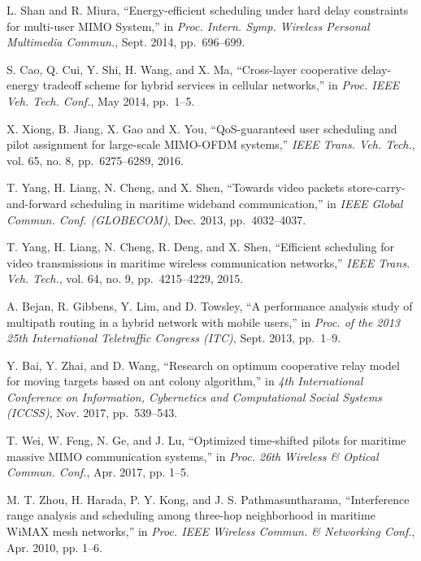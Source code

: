 \documentclass[conference]{IEEEtran}
\begin{document}
\begin{thebibliography}{10}
  L. Shan and R. Miura, ``Energy-efficient scheduling under hard delay constraints for multi-user MIMO System,'' in
  \emph{Proc. Intern. Symp. Wireless Personal Multimedia Commun.}, Sept. 2014, pp.~696--699.
  
  S. Cao, Q. Cui, Y. Shi, H. Wang, and X. Ma, ``Cross-layer cooperative delay-energy tradeoff scheme for hybrid services in cellular networks,'' in
  \emph{Proc. IEEE Veh. Tech. Conf.}, May 2014, pp.~1--5.
  
  X. Xiong, B. Jiang, X. Gao and X. You, ``QoS-guaranteed user scheduling and pilot assignment for large-scale MIMO-OFDM systems,''
  \emph{IEEE Trans. Veh. Tech.}, vol. 65, no. 8, pp.~6275--6289, 2016.
  
  

  T. Yang, H. Liang, N. Cheng, and X. Shen, 
  ``Towards video packets store-carry-and-forward scheduling in maritime wideband communication,'' in
  \emph{IEEE Global Commun. Conf. (GLOBECOM)}, Dec. 2013, pp.~4032--4037.

  T. Yang, H. Liang, N. Cheng, R. Deng, and X. Shen, ``Efficient scheduling for video transmissions in maritime wireless communication networks,'' 
  \emph{IEEE Trans. Veh. Tech.}, vol. 64, no. 9, pp.~4215--4229, 2015.

  A. Bejan, R. Gibbens, Y. Lim, and D. Towsley, 
  ``A performance analysis study of multipath routing in a hybrid network with mobile users,'' in 
  \emph{Proc. of the 2013 25th International Teletraffic Congress (ITC)}, Sept. 2013, pp.~1--9.

  Y. Bai, Y. Zhai, and D. Wang, 
  ``Research on optimum cooperative relay model for moving targets based on ant colony algorithm,'' in
  \emph{4th International Conference on Information, Cybernetics and Computational Social Systems (ICCSS)}, Nov. 2017, pp.~539--543.


  T. Wei, W. Feng, N. Ge, and J. Lu, ``Optimized time-shifted pilots for maritime massive MIMO communication systems,'' in
  \emph{Proc. 26th Wireless \& Optical Commun. Conf.}, Apr. 2017, pp. 1--5.


  M. T. Zhou, H. Harada, P. Y. Kong, and J. S. Pathmasuntharama, ``Interference range analysis and scheduling among three-hop neighborhood in maritime WiMAX mesh networks,'' in 
  \emph{Proc. IEEE Wireless Commun. \& Networking Conf.}, Apr. 2010, pp. 1--6.


\end{thebibliography}
\end{document}
